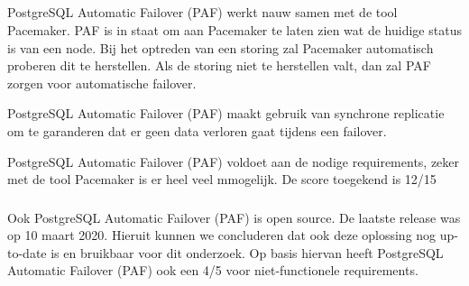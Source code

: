 \subsection{}
\label{subsec:Oplossing 3: PostgreSQL Automatic Failover (PAF)}

\subsubsection{}
\label{subsubsec:Functionele Requirements}

PostgreSQL Automatic Failover (PAF) werkt nauw samen met de tool Pacemaker. PAF is in staat om aan Pacemaker te laten zien wat de huidige status is van een node. Bij het optreden van een storing zal Pacemaker automatisch proberen dit te herstellen.
Als de storing niet te herstellen valt, dan zal PAF zorgen voor automatische failover.

PostgreSQL Automatic Failover (PAF) maakt gebruik van synchrone replicatie om te garanderen dat er geen data verloren gaat tijdens een failover.

PostgreSQL Automatic Failover (PAF) voldoet aan de nodige requirements, zeker met de tool Pacemaker is er heel veel mmogelijk. De score toegekend is 12/15

\subsubsection{}
\label{subsubsec:Niet-functionele Requirements}

Ook PostgreSQL Automatic Failover (PAF) is open source.
De laatste release was op 10 maart 2020. Hieruit kunnen we concluderen dat ook deze oplossing nog up-to-date is en bruikbaar voor dit onderzoek.
Op basis hiervan heeft PostgreSQL Automatic Failover (PAF) ook een 4/5 voor niet-functionele requirements.


\subsection{}
\label{subsec:Oplossing 4: Replication Manager (RepMgr)}

